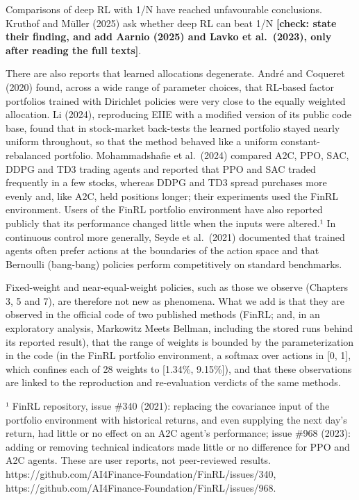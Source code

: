 \documentclass[12pt,a4paper]{report}
\begin{document}
Comparisons of deep RL with 1/N have reached unfavourable conclusions.
Kruthof and Müller (2025) ask whether deep RL can beat 1/N
\textbf{{[}check: state their finding, and add Aarnio (2025) and Lavko
et al.~(2023), only after reading the full texts{]}}.

There are also reports that learned allocations degenerate. André and
Coqueret (2020) found, across a wide range of parameter choices, that
RL-based factor portfolios trained with Dirichlet policies were very
close to the equally weighted allocation. Li (2024), reproducing EIIE
with a modified version of its public code base, found that in
stock-market back-tests the learned portfolio stayed nearly uniform
throughout, so that the method behaved like a uniform
constant-rebalanced portfolio. Mohammadshafie et al.~(2024) compared
A2C, PPO, SAC, DDPG and TD3 trading agents and reported that PPO and SAC
traded frequently in a few stocks, whereas DDPG and TD3 spread purchases
more evenly and, like A2C, held positions longer; their experiments used
the FinRL environment. Users of the FinRL portfolio environment have
also reported publicly that its performance changed little when the
inputs were altered.¹ In continuous control more generally, Seyde et
al.~(2021) documented that trained agents often prefer actions at the
boundaries of the action space and that Bernoulli (bang-bang) policies
perform competitively on standard benchmarks.

Fixed-weight and near-equal-weight policies, such as those we observe
(Chapters 3, 5 and 7), are therefore not new as phenomena. What we add
is that they are observed in the official code of two published methods
(FinRL; and, in an exploratory analysis, Markowitz Meets Bellman,
including the stored runs behind its reported result), that the range of
weights is bounded by the parameterization in the code (in the FinRL
portfolio environment, a softmax over actions in {[}0, 1{]}, which
confines each of 28 weights to {[}1.34\%, 9.15\%{]}), and that these
observations are linked to the reproduction and re-evaluation verdicts
of the same methods.

¹ FinRL repository, issue \#340 (2021): replacing the covariance input
of the portfolio environment with historical returns, and even supplying
the next day's return, had little or no effect on an A2C agent's
performance; issue \#968 (2023): adding or removing technical indicators
made little or no difference for PPO and A2C agents. These are user
reports, not peer-reviewed results.
https://github.com/AI4Finance-Foundation/FinRL/issues/340,
https://github.com/AI4Finance-Foundation/FinRL/issues/968.
\end{document}
